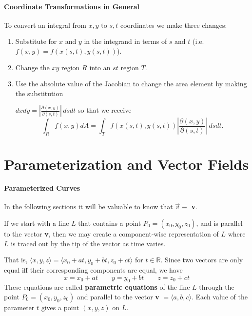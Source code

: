 \documentclass[12pt, a4paper]{article}
\theoremstyle{plain}
\theoremstyle{definition}
\theoremstyle{remark}
\newcommand{\RR}{\mathbb{R}}
\begin{document}
\subsection{Coordinate Transformations in General}

To convert an integral from $x,y$ to $s,t$ coordinates we make three changes:

\begin{enumerate}
\item Substitute for $x$ and $y$ in the integrand in terms of $s$ and $t$ (i.e. $f(x,y) = f(x(s,t),y(s,t))$).
\item Change the $xy$ region $R$ into an $st$ region $T$.
\item Use the absolute value of the Jacobian to change the area element by making the substitution

$ dxdy = \left| \frac{\partial (x,y)}{\partial (s,t)}  \right| \, dsdt$
so that we receive $$\int_R f(x,y) dA = \int_T f(x(s,t),y(s,t)) \left| \frac{\partial (x,y)}{\partial (s,t)}  \right| \, dsdt.$$
\end{enumerate}












\newpage
\part{Parameterization and Vector Fields }










\subsection{Parameterized Curves}

In the following sections it will be valuable to know that $\vec{v} \equiv$ \textbf{v}. 

If we start with a line $L$ that contains a point $P_0 = (x_0, y_0, z_0)$, and is parallel to the vector \textbf{v}, then we may create a component-wise representation of $L$ where $L$ is traced out by the tip of the vector as time varies.

That is,  $\langle x, y, z \rangle = \langle x_0+at, y_0+bt, z_0+ct \rangle $ for $t\in\RR$. Since two vectors are only equal iff their corresponding components are equal, we have
$$ x=x_0+at \quad \quad y=y_0+bt \quad \quad z=z_0+ct $$
These equations are called \textbf{parametric equations} of the line $L$ through the point  $P_0 = (x_0, y_0, z_0)$ and parallel to the vector \textbf{v} $= \langle a, b, c \rangle$. Each value of the parameter $t$ gives a point $(x, y, z)$ on $L$.
\end{document}
